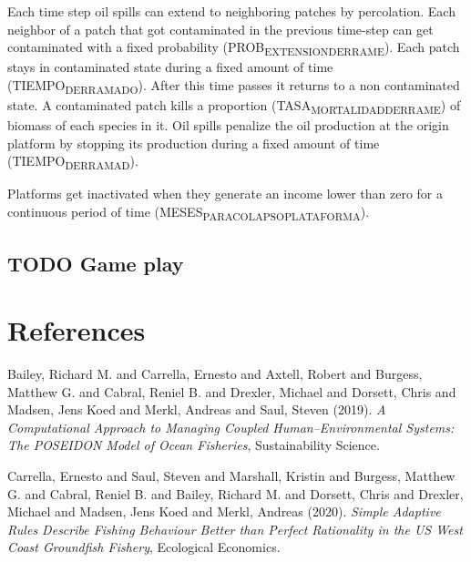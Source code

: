 \documentclass[11pt]{article}
\begin{document}
Each time step oil spills can extend to neighboring patches by percolation. Each neighbor of a patch that got contaminated in the previous time-step can get contaminated with a fixed probability (PROB\textsubscript{EXTENSION}\textsubscript{DERRAME}). Each patch stays in contaminated state during a fixed amount of time (TIEMPO\textsubscript{DERRAMADO}). After this time passes it returns to a non contaminated state. A contaminated patch kills a proportion (TASA\textsubscript{MORTALIDAD}\textsubscript{DERRAME}) of biomass of each species in it. Oil spills penalize the oil production at the origin platform by stopping its production during a fixed amount of time (TIEMPO\textsubscript{DERRAMAD}).

Platforms get inactivated when they generate an income lower than zero for a continuous period of time (MESES\textsubscript{PARA}\textsubscript{COLAPSO}\textsubscript{PLATAFORMA}).

\subsection{{\bfseries\sffamily TODO} Game play}
\label{sec:org91887bc}

\section{References}
\label{sec:orgf1ad4ed}
\noindent
Bailey, Richard M. and Carrella, Ernesto and Axtell, Robert and Burgess, Matthew G. and Cabral, Reniel B. and Drexler, Michael and Dorsett, Chris and Madsen, Jens Koed and Merkl, Andreas and Saul, Steven (2019). \emph{A Computational Approach to Managing Coupled Human--Environmental Systems: The {{POSEIDON}} Model of Ocean Fisheries}, Sustainability Science.

\noindent
Carrella, Ernesto and Saul, Steven and Marshall, Kristin and Burgess, Matthew G. and Cabral, Reniel B. and Bailey, Richard M. and Dorsett, Chris and Drexler, Michael and Madsen, Jens Koed and Merkl, Andreas (2020). \emph{Simple {{Adaptive Rules Describe Fishing Behaviour Better}} than {{Perfect Rationality}} in the {{US West Coast Groundfish Fishery}}}, Ecological Economics.
\end{document}
